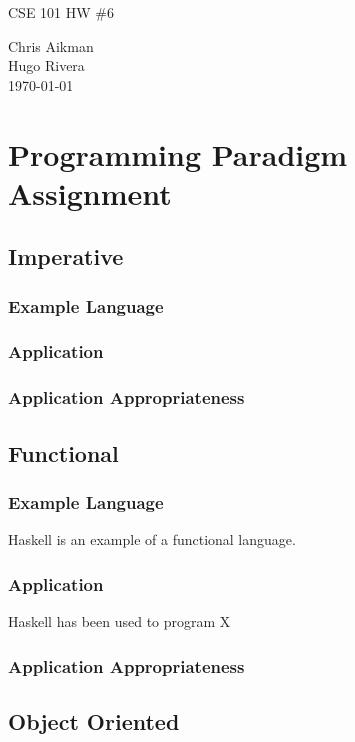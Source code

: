 \documentclass[hidelinks,12pt]{article}
\begin{document}
\begin{titlepage}
\begin{center}
\Huge {CSE 101 HW \#6}\\
[1cm]
\normalsize

Chris Aikman\\
Hugo Rivera\\
[1cm]

{\today}

\end{center}
\end{titlepage}

\newpage

\section{Programming Paradigm Assignment}
\subsection{Imperative}
\subsubsection{Example Language}
\subsubsection{Application}
\subsubsection{Application Appropriateness}
\subsection{Functional}
\subsubsection{Example Language}
Haskell is an example of a functional language.
\subsubsection{Application}
Haskell has been used to program X
\subsubsection{Application Appropriateness}
\subsection{Object Oriented}
\end{document}
